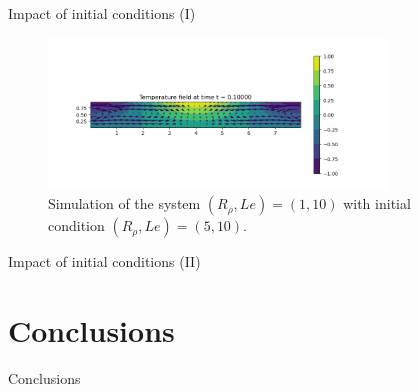 \documentclass[10pt]{beamer}
\begin{document}
\begin{frame}{Impact of initial conditions (I)}
  \begin{figure}
    \centering
    \includegraphics[width=0.8\textwidth]{images/last_subsection/combination_temperature_temp_R_rho_5_to_1_prs_0_1.png}
    \caption{Simulation of the system $(R_{\rho},Le) = (1,10)$ with initial condition $(R_{\rho},Le) = (5,10)$.}
  \end{figure}
\end{frame}

\begin{frame}{Impact of initial conditions (II)}

\end{frame}
\section{Conclusions}

\begin{frame}{Conclusions}

\end{frame}
\end{document}
